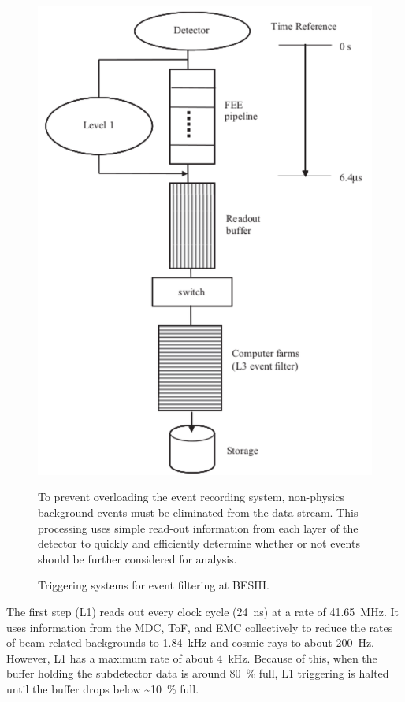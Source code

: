 \begin{figure}%
\centering
\includegraphics[scale=0.75]{figures/images/triggering.pdf}
\caption{Triggering systems for event filtering at BESIII.}
{To prevent overloading the event recording system, non-physics background events must be eliminated from the data stream.
This processing uses simple read-out information from each layer of the detector to quickly and efficiently determine whether or not events should be further considered for analysis.}
\label{fig:triggering}
\end{figure}

The first step (L1) reads out every clock cycle (\SI{24}{\ns}) at a rate of \SI{41.65}{\MHz}.
It uses information from the MDC, ToF, and EMC collectively to reduce the rates of beam-related backgrounds to \SI{1.84}{\kHz} and cosmic rays to about \SI{200}{\Hz}.
However, L1 has a maximum rate of about \SI{4}{\kHz}.
Because of this, when the buffer holding the subdetector data is around \SI{80}{\%} full, L1 triggering is halted until the buffer drops below \SI{~10}{\%} full.


